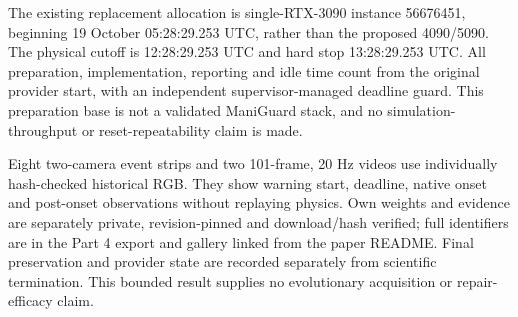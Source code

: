 The existing replacement allocation is single-RTX-3090 instance 56676451, beginning
19 October 05:28:29.253 UTC, rather than the proposed 4090/5090. The physical cutoff
is 12:28:29.253 UTC and hard stop 13:28:29.253 UTC. All preparation, implementation,
reporting and idle time count from the original provider start, with an independent
supervisor-managed deadline guard. This preparation base is not a validated ManiGuard
stack, and no simulation-throughput or reset-repeatability claim is made.

Eight two-camera event strips and two 101-frame, 20 Hz videos use individually
hash-checked historical RGB. They show warning start, deadline, native onset and
post-onset observations without replaying physics. Own weights and evidence are
separately private, revision-pinned and download/hash verified; full identifiers
are in the Part 4 export and gallery linked from the paper README. Final
preservation and provider state are recorded separately from scientific termination.
This bounded result supplies no evolutionary acquisition or repair-efficacy claim.

